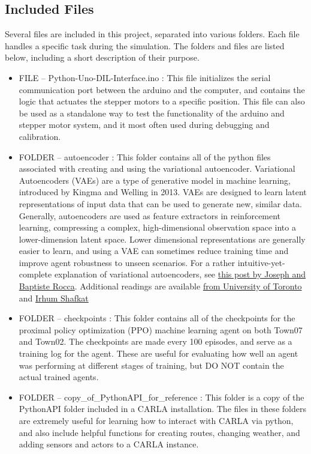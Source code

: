 \documentclass[12pt,oneside,letterpaper]{article}
\begin{document}
\subsection{Included Files}
Several files are included in this project, separated into various folders. Each file handles a specific task during the simulation. The folders and files are listed below, including a short description of their purpose.
\begin{itemize}
\item FILE -- Python-Uno-DIL-Interface.ino : This file initializes the serial communication port between the arduino and the computer, and contains the logic that actuates the stepper motors to a specific position. This file can also be used as a standalone way to test the functionality of the arduino and stepper motor system, and it most often used during debugging and calibration.
\item FOLDER -- autoencoder : This folder contains all of the python files associated with creating and using the variational autoencoder. Variational Autoencoders (VAEs) are a type of generative model in machine learning, introduced by Kingma and Welling in 2013. VAEs are designed to learn latent representations of input data that can be used to generate new, similar data. Generally, autoencoders are used as feature extractors in reinforcement learning, compressing a complex, high-dimensional observation space into a lower-dimension latent space. Lower dimensional representations are generally easier to learn, and using a VAE can sometimes reduce training time and improve agent robustness to unseen scenarios. For a rather intuitive-yet-complete explanation of variational autoencoders, see \href{https://towardsdatascience.com/understanding-variational-autoencoders-vaes-f70510919f73}{this post by Joseph and Baptiste Rocca}. Additional readings are available \href{https://www.cs.toronto.edu/~rgrosse/courses/csc421_2019/slides/lec17.pdf}{from University of Toronto} and \href{https://towardsdatascience.com/intuitively-understanding-variational-autoencoders-1bfe67eb5daf}{Irhum Shafkat}
\item FOLDER -- checkpoints : This folder contains all of the checkpoints for the proximal policy optimization (PPO) machine learning agent on both Town07 and Town02. The checkpoints are made every 100 episodes, and serve as a training log for the agent. These are useful for evaluating how well an agent was performing at different stages of training, but DO NOT contain the actual trained agents.
\item FOLDER -- copy\_of\_PythonAPI\_for\_reference : This folder is a copy of the PythonAPI folder included in a CARLA installation. The files in these folders are extremely useful for learning how to interact with CARLA via python, and also include helpful functions for creating routes, changing weather, and adding sensors and actors to a CARLA instance. 

\end{itemize}
\end{document}
